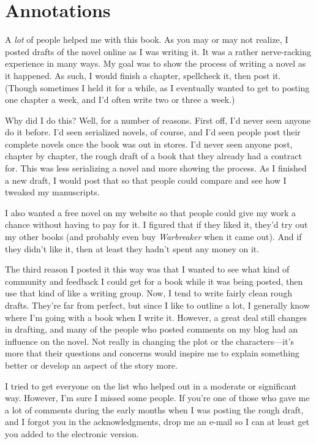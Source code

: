 \section*{Annotations}

A \textit{lot} of people helped me with this book. As you may or may not realize, I posted drafts of the novel online as I was writing it. It was a rather nerve-racking experience in many ways. My goal was to show the process of writing a novel as it happened. As such, I would finish a chapter, spellcheck it, then post it. (Though sometimes I held it for a while, as I eventually wanted to get to posting one chapter a week, and I'd often write two or three a week.)

Why did I do this? Well, for a number of reasons. First off, I'd never seen anyone do it before. I'd seen serialized novels, of course, and I'd seen people post their complete novels once the book was out in stores. I'd never seen anyone post, chapter by chapter, the rough draft of a book that they already had a contract for. This was less serializing a novel and more showing the process. As I finished a new draft, I would post that so that people could compare and see how I tweaked my manuscripts.

I also wanted a free novel on my website so that people could give my work a chance without having to pay for it. I figured that if they liked it, they'd try out my other books (and probably even buy \textit{Warbreaker} when it came out). And if they didn't like it, then at least they hadn't spent any money on it.

The third reason I posted it this way was that I wanted to see what kind of community and feedback I could get for a book while it was being posted, then use that kind of like a writing group. Now, I tend to write fairly clean rough drafts. They're far from perfect, but since I like to outline a lot, I generally know where I'm going with a book when I write it. However, a great deal still changes in drafting, and many of the people who posted comments on my blog had an influence on the novel. Not really in changing the plot or the characters---it's more that their questions and concerns would inspire me to explain something better or develop an aspect of the story more.

I tried to get everyone on the list who helped out in a moderate or significant way. However, I'm sure I missed some people. If you're one of those who gave me a lot of comments during the early months when I was posting the rough draft, and I forgot you in the acknowledgments, drop me an e-mail so I can at least get you added to the electronic version.
